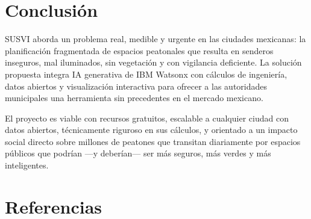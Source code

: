 \documentclass[12pt,a4paper]{article}
\begin{document}
\newpage
\section{Conclusión}

SUSVI aborda un problema real, medible y urgente en las ciudades mexicanas: la planificación fragmentada de espacios peatonales que resulta en senderos inseguros, mal iluminados, sin vegetación y con vigilancia deficiente. La solución propuesta integra IA generativa de IBM Watsonx con cálculos de ingeniería, datos abiertos y visualización interactiva para ofrecer a las autoridades municipales una herramienta sin precedentes en el mercado mexicano.

El proyecto es viable con recursos gratuitos, escalable a cualquier ciudad con datos abiertos, técnicamente riguroso en sus cálculos, y orientado a un impacto social directo sobre millones de peatones que transitan diariamente por espacios públicos que podrían —y deberían— ser más seguros, más verdes y más inteligentes.


\newpage
\section{Referencias}
\end{document}
